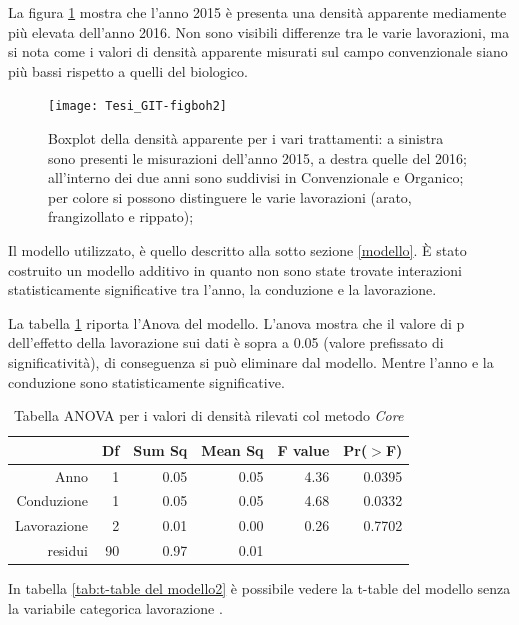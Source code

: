 \documentclass[11pt, a4paper, openright, titlepage, final, language = italian]{book}
\begin{document}
La figura \ref{fig:boxplotCore} mostra che l'anno 2015 \`e presenta
una densit\`a apparente mediamente pi\`u elevata dell'anno 2016. Non
sono visibili differenze tra le varie lavorazioni, ma si nota come i
valori di densit\`a apparente misurati sul campo convenzionale siano
pi\`u bassi rispetto a quelli del biologico.



\begin{figure}[hb]
  \centering
\texttt{[image: Tesi\_GIT-figboh2]}

\caption{Boxplot della densit\`a apparente per i vari trattamenti: 
  a sinistra sono presenti le misurazioni dell'anno 2015, a destra quelle del 2016; 
  all'interno dei due anni sono suddivisi in Convenzionale e Organico; 
  per colore si possono distinguere le varie lavorazioni (arato, frangizollato e rippato);
  }
  
  \label{fig:boxplotCore}
\end{figure}
\FloatBarrier


Il modello utilizzato, \`e quello descritto alla sotto sezione
\ref{modello}. \`E stato costruito un modello additivo in quanto non
sono state trovate interazioni statisticamente significative tra
l'anno, la conduzione e la lavorazione.

La tabella \ref{tab:anova del modello} riporta l'Anova del
modello. L'anova mostra che il valore di p dell'effetto della lavorazione
sui dati \`e sopra a 0.05 (valore prefissato di significativit\`a), di
conseguenza si pu\`o eliminare dal modello. Mentre l'anno e la
conduzione sono statisticamente significative.


\begin{table}[ht]
\centering
\caption{Tabella ANOVA per i valori di densità rilevati col metodo \emph{Core}} 
\label{tab:anova del modello}
\begin{tabular}{rrrrrr}
  \hline
 & Df & Sum Sq & Mean Sq & F value & Pr($>$F) \\ 
  \hline
Anno & 1 & 0.05 & 0.05 & 4.36 & 0.0395 \\ 
  Conduzione & 1 & 0.05 & 0.05 & 4.68 & 0.0332 \\ 
  Lavorazione & 2 & 0.01 & 0.00 & 0.26 & 0.7702 \\ 
  residui & 90 & 0.97 & 0.01 &  &  \\ 
   \hline
\end{tabular}
\end{table}
In tabella \ref{tab:t-table del modello2} \`e possibile vedere la
t-table del modello senza la variabile categorica lavorazione
.
\end{document}
